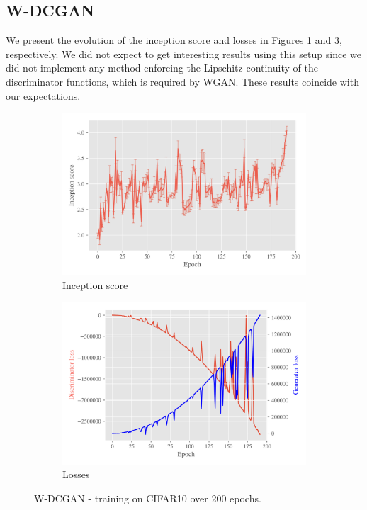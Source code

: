 \subsection{W-DCGAN}
\label{sec:exp-w-dcgan}
We present the evolution of the inception score and losses in Figures \ref{fig:exp-w-dcgan-is} and \ref{fig:exp-w-dcgan-losses}, respectively. We did not expect to get interesting results using this setup since we did not implement any method enforcing the Lipschitz continuity of the discriminator functions, which is required by WGAN. These results coincide with our expectations.
   
\begin{figure}[H]
    \centering
    \begin{subfigure}[t]{0.49\textwidth}
        \centering
		\includegraphics[width=\textwidth]{../code/results/figures/w-dcgan_cifar10_is.png}
		\caption{Inception score}
		\label{fig:exp-w-dcgan-is}
    \end{subfigure}
    \begin{subfigure}[t]{0.49\textwidth}
        \centering
        \includegraphics[width=\textwidth]{../code/results/figures/w-dcgan_cifar10_losses.png}
		\caption{Losses}
		\label{fig:exp-w-dcgan-losses}
    \end{subfigure}
    \caption{W-DCGAN - training on CIFAR10 over 200 epochs.}
\end{figure}

